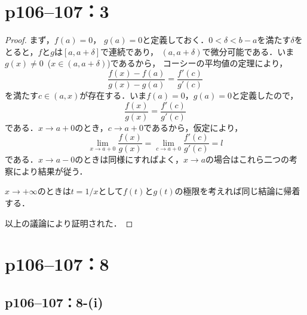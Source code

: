 \documentclass[a4paper,10pt,fleqn]{ltjsarticle}
\begin{document}
\newpage

\section*{p106--107：3}

\begin{tleftbar}
    \begin{proof}
        まず，$f(a)=0$， $g(a)=0$と定義しておく．$0<\delta <b-a$を満たす$\delta$をとると，$f$と$g$は$[a,a+\delta]$で連続であり，
        $(a,a+\delta)$で微分可能である．いま$g(x) \ne 0$~($ x \in (a,a+\delta)$)であるから，
        コーシーの平均値の定理により，
        \[
            \frac{f(x)-f(a)}{g(x)-g(a)} = \frac{f'(c)}{g'(c)}
        \]
        を満たす$c \in (a,x)$が存在する．いま$f(a)=0$，$g(a)=0$と定義したので，
        \[
            \frac{f(x)}{g(x)} = \frac{f'(c)}{g'(c)}
        \]
        である．$ x \to a+0$のとき，$c \to a+0$であるから，仮定により，
        \[
            \lim_{x \to a+0} \frac{f(x)}{g(x)} = \lim_{c \to a+0} \frac{f'(c)}{g'(c)} =l
        \]
        である．$ x \to a-0$のときは同様にすればよく，$ x \to a$の場合はこれら二つの考察により結果が従う．

        $ x \to +\infty$のときは$ t=1/x$として$f(t)$と$g(t)$の極限を考えれば同じ結論に帰着する．

        以上の議論により証明された．
    \end{proof}
\end{tleftbar}

\newpage



\section*{p106--107：8}


\subsection*{p106--107：8-(i)}
\end{document}

